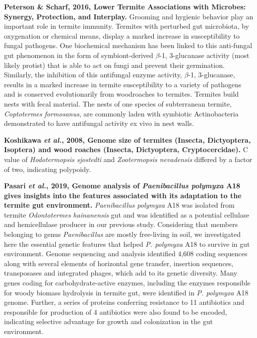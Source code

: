 \documentclass[11pt]{article}
\begin{document}
\begin{sloppypar}
\par
\textbf{Peterson & Scharf, 2016, Lower Termite Associations with Microbes: Synergy, Protection, and Interplay.} \newline
Grooming and hygienic behavior play an important role in termite immunity. 
Termites with perturbed gut microbiota, by oxygenation or chemical means, display a marked increase in susceptibility to fungal pathogens. 
One biochemical mechanism has been linked to this anti-fungal gut phenomenon in the form of symbiont-derived $\beta$-1, 3-glucanase activity (most likely protist) that is able to act on fungi and prevent their germination. 
Similarly, the inhibition of this antifungal enzyme activity, $\beta$-1, 3-glucanase, results in a marked increase in termite susceptibility to a variety of pathogens and is conserved evolutionarily from woodroaches to termites. 
Termites build nests with fecal material. 
The nests of one species of subterranean termite, \textit{Coptotermes formosanus}, are commonly laden with symbiotic Actinobacteria demonstrated to have antifungal activity ex vivo in nest walls.
\par
\textbf{Koshikawa \textit{et al.}, 2008, Genome size of termites (Insecta, Dictyoptera, Isoptera) and wood roaches (Insecta, Dictyoptera, Cryptocercidae).} \newline
C value of \textit{Hodotermopsis sjostedti} and \textit{Zootermopsis nevadensis} differed by a factor of two, indicating polypoidy.
\par
\textbf{Pasari \textit{et al.}, 2019, Genome analysis of \textit{Paenibacillus polymyxa} A18 gives insights into the features associated with its adaptation to the termite gut environment.} \newline
\textit{Paenibacillus polymyxa} A18 was isolated from termite \textit{Odontotermes hainanensis} gut and was identified as a potential cellulase and hemicellulase producer in our previous study. 
Considering that members belonging to genus \textit{Paenibacillus} are mostly free-living in soil, we investigated here the essential genetic features that helped \textit{P. polymyxa} A18 to survive in gut environment. 
Genome sequencing and analysis identified 4,608 coding sequences along with several elements of horizontal gene transfer, insertion sequences, transposases and integrated phages, which add to its genetic diversity. 
Many genes coding for carbohydrate-active enzymes, including the enzymes responsible for woody biomass hydrolysis in termite gut, were identified in \textit{P. polymyxa} A18 genome. 
Further, a series of proteins conferring resistance to 11 antibiotics and responsible for production of 4 antibiotics were also found to be encoded, indicating selective advantage for growth and colonization in the gut environment. 

\end{sloppypar}
\end{document}
